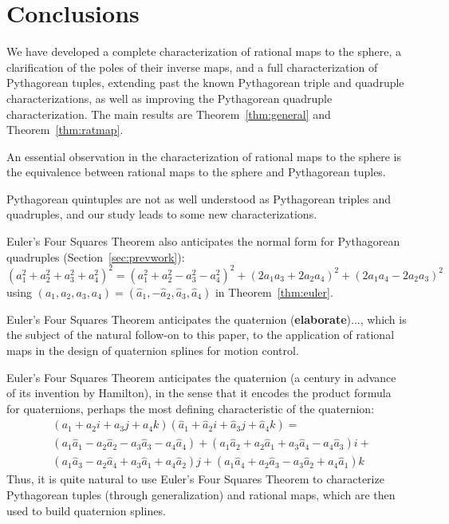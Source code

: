 \documentclass[12pt]{article}
\begin{document}

\section{Conclusions}
\label{sec:conclude}

We have developed a complete characterization of rational maps to the sphere,
a clarification of the poles of their inverse maps,
and a full characterization of Pythagorean tuples, 
extending past the known Pythagorean
triple and quadruple characterizations, as well as improving the Pythagorean
quadruple characterization.
The main results are Theorem~\ref{thm:general} and Theorem~\ref{thm:ratmap}.

An essential observation in the characterization of rational maps to the sphere 
is the equivalence between rational maps to the sphere and Pythagorean tuples.

Pythagorean quintuples are not as well understood as Pythagorean triples
and quadruples, and our study leads to some new characterizations.

\begin{rmk}
Euler's Four Squares Theorem also anticipates the normal form
for Pythagorean quadruples (Section~\ref{sec:prevwork}):
\begin{equation}
\label{eq:euler1}
(a_1^2 + a_2^2 + a_3^2 + a_4^2)^2 = 
(a_1^2 + a_2^2 - a_3^2 - a_4^2)^2 + (2a_1a_3+2a_2a_4)^2 + (2a_1a_4-2a_2a_3)^2
\end{equation}
using $(a_1,a_2,a_3,a_4) = (\hat{a}_1,-\hat{a}_2,\hat{a}_3,\hat{a}_4)$ in 
Theorem~\ref{thm:euler}.
\end{rmk}

Euler's Four Squares Theorem anticipates the quaternion ({\bf elaborate})...,
which is the subject of the natural follow-on to this paper, 
to the application of rational maps in the design of quaternion splines
for motion control.

\begin{rmk}
Euler's Four Squares Theorem anticipates
the quaternion (a century in advance of its invention by Hamilton),
in the sense that it encodes the product formula for quaternions,
perhaps the most defining characteristic of the quaternion:
\[
\begin{array}{ll}
& (a_1 + a_2 i + a_3 j + a_4 k) 
(\hat{a}_1 + \hat{a}_2 i + \hat{a}_3 j + \hat{a}_4 k) = \\
& (a_1 \hat{a}_1 - a_2\hat{a}_2 - a_3\hat{a}_3 - a_4\hat{a}_4) +
   (a_1\hat{a}_2 + a_2\hat{a}_1 + a_3\hat{a}_4 - a_4\hat{a}_3) i + \\
&  (a_1\hat{a}_3 - a_2\hat{a}_4 + a_3\hat{a}_1 + a_4\hat{a}_2) j +
   (a_1\hat{a}_4 + a_2\hat{a}_3 - a_3\hat{a}_2 + a_4\hat{a}_1) k
\end{array}
\]
Thus, it is quite natural to use Euler's Four Squares Theorem
to characterize Pythagorean tuples (through generalization) and rational maps, 
which are then used to build quaternion splines.
\end{rmk}
\end{document}
